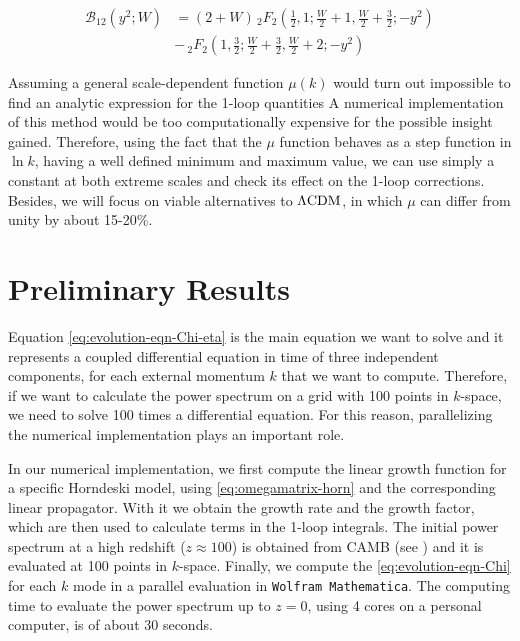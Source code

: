 \begin{align}
\mathcal{B}_{12}(y^{2};W) & =(2+W)\,_{2}F_{2}\left(\frac{1}{2},1;\frac{W}{2}+1,\frac{W}{2}+\frac{3}{2};-y^{2}\right)\\
 & -\,_{2}F_{2}\left(1,\frac{3}{2};\frac{W}{2}+\frac{3}{2},\frac{W}{2}+2;-y^{2}\right)
\end{align}


Assuming a general scale-dependent function $\mu(k)$ would turn out impossible to find
an analytic expression for the 1-loop quantities A numerical
implementation of this method would be too computationally expensive for the possible insight gained.
Therefore, using the fact that the $\mu$
function behaves as a step function in $\ln k$, having a well defined
minimum and maximum value, we can use simply a constant at both extreme scales and check its
effect on the 1-loop corrections. Besides, we will focus on viable
alternatives to $\Lambda\mathrm{CDM}$, in which $\mu$ can differ from unity by
about 15-20\%.



\section{Preliminary Results}

Equation \cref{eq:evolution-eqn-Chi-eta} is the main equation
we want to solve and it represents a coupled differential equation in time 
of three independent components,
for each external momentum $k$ that we want to compute. Therefore, 
if we want to calculate the power spectrum on a grid with 100 points
in $k$-space, we need to solve 100 times a differential equation.
For this reason, parallelizing the numerical implementation plays an important role.

In our numerical implementation, we first compute the linear growth function for a specific Horndeski
model, using \cref{eq:omegamatrix-horn} and the corresponding linear propagator. 
With it we
obtain the growth rate and the growth factor, which are then used
to calculate terms in the 1-loop integrals.
The initial power spectrum at a high redshift ($z \approx 100$)
is obtained from CAMB (see \cite{lewis_efficient_2000})
and it is evaluated
at 100 points in $k$-space. 
Finally, we compute the \ref{eq:evolution-eqn-Chi} for each $k$ mode
in  a parallel evaluation in \texttt{Wolfram Mathematica}. 
The computing time to evaluate the power spectrum up to $z=0$,
using 4 cores on a personal computer, is of about
30 seconds.

